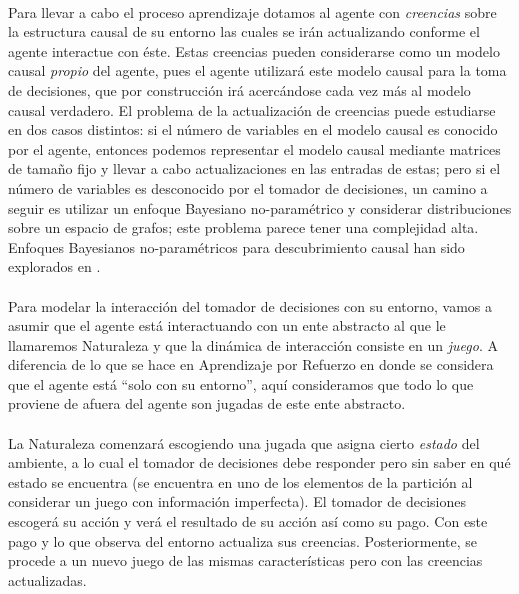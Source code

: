 \documentclass[11pt]{article}
\theoremstyle{plain}
\begin{document}
\\
\indent Para llevar a cabo el proceso aprendizaje dotamos al agente con \textit{creencias} sobre la estructura causal de su entorno las cuales se irán actualizando conforme el agente interactue con éste. Estas creencias pueden considerarse como un modelo causal \textit{propio} del agente, pues el agente utilizará este modelo causal para la toma de decisiones, que por construcción irá acercándose cada vez más al modelo causal verdadero. El problema de la actualización de creencias puede estudiarse en dos casos distintos: si el número de variables en el modelo causal es conocido por el agente, entonces podemos representar el modelo causal mediante matrices de tamaño fijo y llevar a cabo actualizaciones en las entradas de estas; pero si el número de variables es desconocido por el tomador de decisiones, un camino a seguir es utilizar un enfoque Bayesiano no-paramétrico y considerar distribuciones sobre un espacio de grafos; este problema parece tener una complejidad alta. Enfoques Bayesianos no-paramétricos para descubrimiento causal han sido explorados en \cite{karabatsos2012bayesian}.\\
\\
\indent Para modelar la interacción del tomador de decisiones con su entorno, vamos a asumir que el agente está interactuando con un ente abstracto al que le llamaremos Naturaleza y que la dinámica de interacción consiste en un \textit{juego}. A diferencia de lo que se hace en Aprendizaje por Refuerzo en donde se considera que el agente está “solo con su entorno”, aquí consideramos que todo lo que proviene de afuera del agente son jugadas de este ente abstracto.\\
\\
\indent La Naturaleza comenzará escogiendo una jugada que asigna cierto \textit{estado} del ambiente, a lo cual el tomador de decisiones debe responder pero sin saber en qué estado se encuentra (se encuentra en uno de los elementos de la partición al considerar un juego con información imperfecta). El tomador de decisiones escogerá su acción y verá el resultado de su acción así como su pago. Con este pago y lo que observa del entorno actualiza sus creencias. Posteriormente, se procede a un nuevo juego de las mismas características pero con las creencias actualizadas.\\
\\
\end{document}
